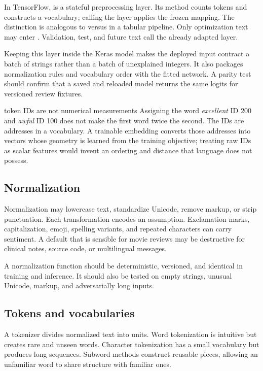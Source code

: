 In TensorFlow,  is a stateful preprocessing layer. Its
 method counts tokens and constructs a vocabulary; calling the
layer applies the frozen mapping. The distinction is analogous to
 versus  in a tabular pipeline. Only optimization
text may enter . Validation, test, and future text call the already
adapted layer.

Keeping this layer inside the Keras model makes the deployed input contract a
batch of strings rather than a batch of unexplained integers. It also packages
normalization rules and vocabulary order with the fitted network. A parity test
should confirm that a saved and reloaded model returns the same logits for
versioned review fixtures.

\begin{misconceptionbox}{token IDs are not numerical measurements}
Assigning the word \emph{excellent} ID 200 and \emph{awful} ID 100 does not make
the first word twice the second. The IDs are addresses in a vocabulary. A
trainable embedding converts those addresses into vectors whose geometry is
learned from the training objective; treating raw IDs as scalar features would
invent an ordering and distance that language does not possess.
\end{misconceptionbox}

\subsection{Normalization}

Normalization may lowercase text, standardize Unicode, remove markup, or strip
punctuation. Each transformation encodes an assumption. Exclamation marks,
capitalization, emoji, spelling variants, and repeated characters can carry
sentiment. A default that is sensible for movie reviews may be destructive for
clinical notes, source code, or multilingual messages.

A normalization function should be deterministic, versioned, and identical in
training and inference. It should also be tested on empty strings, unusual
Unicode, markup, and adversarially long inputs.

\subsection{Tokens and vocabularies}

A tokenizer divides normalized text into units. Word tokenization is intuitive
but creates rare and unseen words. Character tokenization has a small
vocabulary but produces long sequences. Subword methods construct reusable
pieces, allowing an unfamiliar word to share structure with familiar ones.

